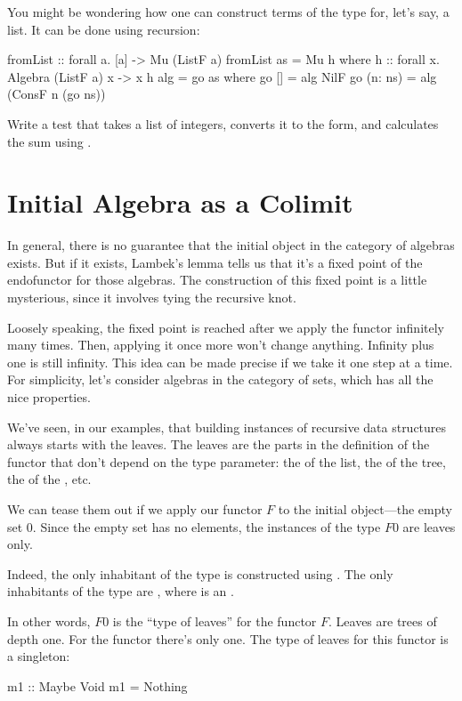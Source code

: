 \documentclass[DaoFP]{subfiles}
\begin{document}
You might be wondering how one can construct terms of the type  for, let's say, a list. It can be done using recursion:
\begin{haskell}
fromList :: forall a. [a] -> Mu (ListF a)
fromList as = Mu h
  where h :: forall x. Algebra (ListF a) x -> x
        h alg = go as
          where
            go [] = alg NilF
            go (n: ns) = alg (ConsF n (go ns))
\end{haskell}

\begin{exercise}
Write a test that takes a list of integers, converts it to the  form, and calculates the sum using .
\end{exercise}


\section{Initial Algebra as a Colimit}

In general, there is no guarantee that the initial object in the category of algebras exists. But if it exists, Lambek's lemma tells us that it's a fixed point of the endofunctor for those algebras.  The construction of this fixed point is a little mysterious, since it involves tying the recursive knot. 

Loosely speaking, the fixed point is reached after we apply the functor infinitely many times. Then, applying it once more won't change anything. Infinity plus one is still infinity. This idea can be made precise if we take it one step at a time. For simplicity, let's consider algebras in the category of sets, which has all the nice properties.

We've seen, in our examples, that building instances of recursive data structures always starts with the leaves. The leaves are the parts in the definition of the functor that don't depend on the type parameter: the  of the list, the  of the tree, the  of the , etc. 

We can tease them out if we apply our functor $F$ to the initial object---the empty set $0$. Since the empty set has no elements, the instances of the type $F 0$ are leaves only. 

Indeed, the only inhabitant of the type  is constructed using . The only inhabitants of the type  are , where  is an .

In other words, $F 0$ is the ``type of leaves'' for the functor $F$. Leaves are trees of depth one. For the  functor there's only one. The type of leaves for this functor is a singleton:
\begin{haskell}
m1 :: Maybe Void
m1 = Nothing
\end{haskell}
\end{document}
